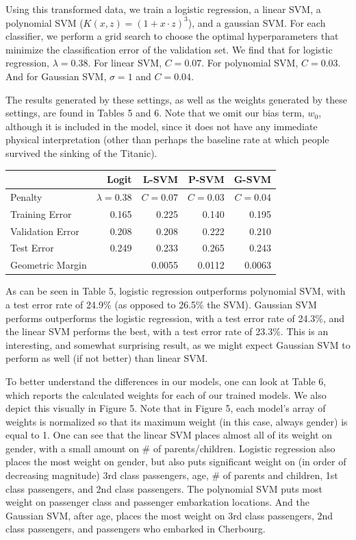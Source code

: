 \documentclass[10pt]{article}
\begin{document}
Using this transformed data, we train a logistic regression, a linear SVM, a polynomial SVM ($K(x,z) = (1+x\cdot z)^3$), and a gaussian SVM. For each classifier, we perform a grid search to choose the optimal hyperparameters that minimize the classification error of the validation set. We find that for logistic regression,  $\lambda = 0.38$. For linear SVM, $C=0.07$. For polynomial SVM, $C=0.03$. And for Gaussian SVM, $\sigma = 1$ and $C=0.04$.

The results generated by these settings, as well as the weights generated by these settings, are found in Tables 5 and 6. Note that we omit our bias term, $w_0$, although it is included in the model, since it does not have any immediate physical interpretation (other than perhaps the baseline rate at which people survived the sinking of the Titanic). 

\begin{table}[ht]
\centering
{}
\begin{tabular}{lrrrr}
\toprule
{} & Logit & L-SVM & P-SVM & G-SVM \\
\midrule
Penalty & $\lambda = 0.38$ & $C = 0.07$ & $C = 0.03$ & $C = 0.04$\\
\midrule
Training Error    &  0.165 &  0.225 & 0.140 &  0.195 \\
Validation Error  &  0.208 &  0.208 & 0.222 &  0.210 \\
Test Error        &  0.249 &  0.233 & 0.265 &  0.243 \\
Geometric Margin  & {}     &  0.0055& 0.0112& 0.0063 \\
\bottomrule
\end{tabular}
\end{table}

As can be seen in Table 5, logistic regression outperforms polynomial SVM, with a test error rate of 24.9\% (as opposed to 26.5\% the SVM). Gaussian SVM performs outperforms the logistic regression, with a test error rate of 24.3\%, and the linear SVM performs the best, with a test error rate of 23.3\%. This is an interesting, and somewhat surprising result, as we might expect Gaussian SVM to perform as well (if not better) than linear SVM.

To better understand the differences in our models, one can look at Table 6, which reports the calculated weights for each of our trained models. We also depict this visually in Figure 5. Note that in Figure 5, each model's array of weights is normalized so that its maximum weight (in this case, always gender) is equal to 1. One can see that the linear SVM places almost all of its weight on gender, with a small amount on \# of parents/children. Logistic regression also places the most weight on gender, but also puts significant weight on (in order of decreasing magnitude) 3rd class passengers, age, \# of parents and children, 1st class passengers, and 2nd class passengers. The polynomial SVM puts most weight on passenger class and passenger embarkation locations. And the Gaussian SVM, after age, places the most weight on 3rd class passengers, 2nd class passengers, and passengers who embarked in Cherbourg.
\end{document}
